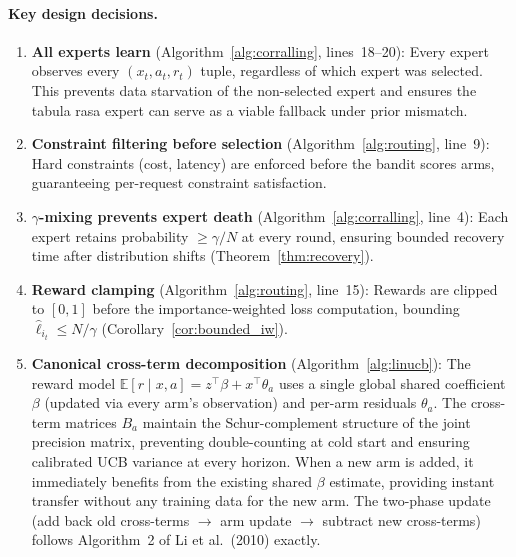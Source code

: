 \paragraph{Key design decisions.}
\begin{enumerate}[leftmargin=*,noitemsep]
    \item \textbf{All experts learn} (Algorithm~\ref{alg:corralling}, lines~18--20):
    Every expert observes every $(x_t, a_t, r_t)$ tuple, regardless of which expert
    was selected.  This prevents data starvation of the non-selected expert and
    ensures the tabula rasa expert can serve as a viable fallback under prior mismatch.
    
    \item \textbf{Constraint filtering before selection} (Algorithm~\ref{alg:routing},
    line~9): Hard constraints (cost, latency) are enforced before the bandit scores
    arms, guaranteeing per-request constraint satisfaction.
    
    \item \textbf{$\gamma$-mixing prevents expert death}
    (Algorithm~\ref{alg:corralling}, line~4): Each expert retains probability
    $\geq \gamma/N$ at every round, ensuring bounded recovery time after
    distribution shifts (Theorem~\ref{thm:recovery}).
    
    \item \textbf{Reward clamping} (Algorithm~\ref{alg:routing}, line~15):
    Rewards are clipped to $[0, 1]$ before the importance-weighted loss computation,
    bounding $\hat{\ell}_{i_t} \leq N/\gamma$
    (Corollary~\ref{cor:bounded_iw}).
    
    \item \textbf{Canonical cross-term decomposition}
    (Algorithm~\ref{alg:linucb}): The reward model
    $\mathbb{E}[r \mid x, a] = z^\top \beta + x^\top \theta_a$
    uses a single global shared coefficient $\beta$ (updated via every arm's
    observation) and per-arm residuals $\theta_a$.  The cross-term matrices
    $B_a$ maintain the Schur-complement structure of the joint precision
    matrix, preventing double-counting at cold start and ensuring calibrated
    UCB variance at every horizon.  When a new arm is added, it immediately
    benefits from the existing shared $\beta$ estimate, providing instant
    transfer without any training data for the new arm.  The two-phase update
    (add back old cross-terms $\to$ arm update $\to$ subtract new cross-terms)
    follows Algorithm~2 of Li et al.\ (2010) exactly.
\end{enumerate}
